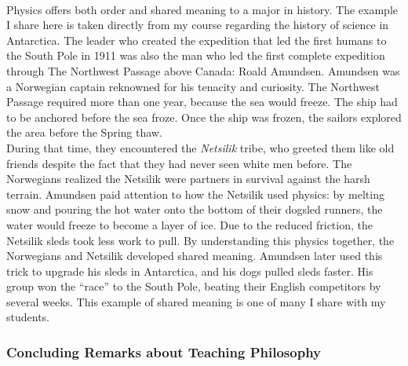 \documentclass[../../../main.tex]{subfiles}
\begin{document}
\\
\vspace{0.15cm}
Physics offers both order and shared meaning to a major in history.  The example I share here is taken directly from my course regarding the history of science in Antarctica.  The leader who created the expedition that led the first humans to the South Pole in 1911 was also the man who led the first complete expedition through The Northwest Passage above Canada: Roald Amundsen.  Amundsen was a Norwegian captain reknowned for his tenacity and curiosity.  The Northwest Passage required more than one year, because the sea would freeze.  The ship had to be anchored before the sea froze.  Once the ship was frozen, the sailors explored the area before the Spring thaw.
\\
\vspace{0.15cm}
During that time, they encountered the \textit{Netsilik} tribe, who greeted them like old friends despite the fact that they had never seen white men before.  The Norwegians realized the Netsilik were partners in survival against the harsh terrain. Amundsen paid attention to how the Netsilik used physics: by melting snow and pouring the hot water onto the bottom of their dogsled runners, the water would freeze to become a layer of ice.  Due to the reduced friction, the Netsilik sleds took less work to pull.  By understanding this physics together, the Norwegians and Netsilik developed shared meaning.  Amundsen later used this trick to upgrade his sleds in Antarctica, and his dogs pulled sleds faster.  His group won the ``race'' to the South Pole, beating their English competitors by several weeks.  This example of shared meaning is one of many I share with my students.

\subsubsection{Concluding Remarks about Teaching Philosophy}
\end{document}
